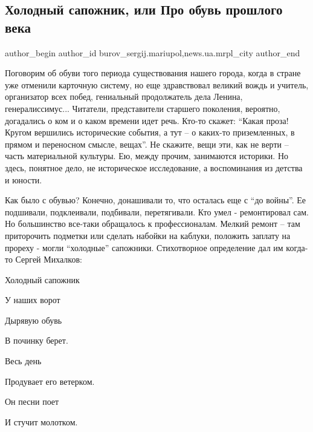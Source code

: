  
 
 
 
 
 
\subsection{Холодный сапожник, или Про обувь прошлого века}
\label{sec:21_10_2017.stz.news.ua.mrpl_city.1.holodnyj_sapozhnik_ili_pro_obuv_proshlogo_veka}
 
\ifcmt
 author_begin
   author_id burov_sergij.mariupol,news.ua.mrpl_city
 author_end
\fi

Поговорим об обуви того периода  существования нашего города, когда в стране
уже отменили карточную систему, но еще здравствовал великий вождь и учитель,
организатор всех побед, гениальный продолжатель дела Ленина, генералиссимус...
Читатели, представители старшего поколения, вероятно, догадались о ком и о
каком времени идет речь. Кто-то скажет: \enquote{Какая проза! Кругом вершились
исторические события, а тут – о каких-то  приземленных, в прямом и переносном
смысле, вещах}. Не скажите, вещи эти, как не верти – часть материальной
культуры. Ею, между прочим, занимаются историки. Но здесь, понятное дело, не
историческое исследование, а воспоминания из детства и юности.

Как было с обувью? Конечно, донашивали то, что осталась еще с \enquote{до войны}. Ее
подшивали, подклеивали, подбивали, перетягивали. Кто умел - ремонтировал сам.
Но большинство все-таки обращалось к профессионалам. Мелкий ремонт – там
приторочить подметки или сделать набойки на каблуки, положить заплату на
прореху -  могли \enquote{холодные} сапожники. Стихотворное определение дал им когда-то
Сергей Михалков: 

Холодный сапожник\par
У наших ворот\par
Дырявую обувь\par
В починку берет. \par
\medskip
Весь день\par
Продувает его ветерком.\par
Он песни поет\par
И стучит молотком.\par

